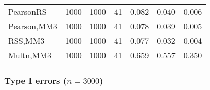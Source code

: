 \documentclass[
]{article}
\begin{document}
\begin{table}[H]
{\begin{tabular}[t]{lrrrrrr}
\hspace{1em}PearsonRS & 1000 & 1000 & 41 & 0.082 & 0.040 & 0.006\\
\hspace{1em}Pearson,MM3 & 1000 & 1000 & 41 & 0.078 & 0.039 & 0.005\\
\hspace{1em}RSS,MM3 & 1000 & 1000 & 41 & 0.077 & 0.032 & 0.004\\
\hspace{1em}Multn,MM3 & 1000 & 1000 & 41 & 0.659 & 0.557 & 0.350\\
\bottomrule
\end{tabular}}
\end{table}

\hypertarget{type-i-errors-n3000-1}{%
\subsubsection{\texorpdfstring{Type I errors
(\(n=3000\))}{Type I errors (n=3000)}}\label{type-i-errors-n3000-1}}
\end{document}

